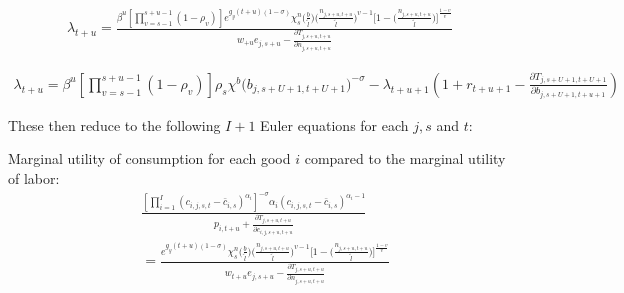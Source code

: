     \begin{equation}
      \begin{split}
      \lambda_{t+u} = \frac{ \beta^u\left[\prod_{v=s-1}^{s+u-1}(1-\rho_v)\right] e^{g_y (t+u)(1-\sigma)}\chi^n_{s}\biggl(\frac{b}{\tilde{l}}\biggr)\biggl(\frac{n_{j,s+u,t+u}}{\tilde{l}}\biggr)^{v-1}\Biggl[1 - \biggl(\frac{n_{j,s+u,t+u}}{\tilde{l}}\biggr)\Biggr]^{\frac{1-v}{v}} } { w_{+u} e_{j,s+u} - \frac{\partial T_{j,s+u,t+u}}{\partial n_{j,s+u,t+u}} }  \nonumber
      \end{split}
    \end{equation}

    \begin{equation}
      \begin{split}
      \lambda_{t+u} = \beta^u\left[\prod_{v=s-1}^{s+u-1}(1-\rho_v)\right] \rho_s\chi^b\bigl(b_{j,s+U+1,t+U+1}\bigr)^{-\sigma} - \lambda_{t+u+1} \left( 1 + r_{t+u+1} - \frac{\partial T_{j,s+U+1,t+U+1}}{\partial b_{j,s+U+1,t+u+1}} \right)
        \end{split}  \nonumber
    \end{equation}

    These then reduce to the following $I+1$ Euler equations for each $j,s$ and $t$:

    Marginal utility of consumption for each good $i$ compared to the marginal utility of labor:
    \begin{equation}\label{EqcEuler}
      \begin{split}
      & \frac{ \left[ \prod_{i=1}^I \left( c_{i,j,s,t} - \bar c_{i,s} \right) ^{\alpha_i} \right]^{-\sigma}\alpha_i \left( c_{i,j,s,t} - \bar c_{i,s} \right)^{\alpha_i-1} } { p_{i,t+u} + \frac{\partial T_{j,s+u,t+u}}{\partial c_{i,j,s+u,t+u}} } \\
      & = \frac{ e^{g_y (t+u)(1-\sigma)}\chi^n_{s}\biggl(\frac{b}{\tilde{l}}\biggr)\biggl(\frac{n_{j,s+u,t+u}}{\tilde{l}}\biggr)^{v-1}\Biggl[1 - \biggl(\frac{n_{j,s+u,t+u}}{\tilde{l}}\biggr)\Biggr]^{\frac{1-v}{v}} } { w_{t+u} e_{j,s+u} - \frac{\partial T_{j,s+u,t+u}}{\partial n_{j,s+u,t+u}} }
       \end{split}
    \end{equation}

